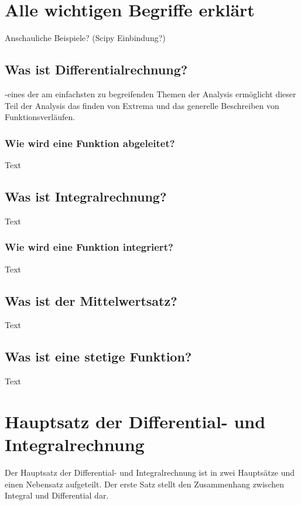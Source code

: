 \documentclass[fontsize=12pt,paper=a4,DIV12,cleardoublepage=empty, 
liststotoc,idxtotoc,bibtotoc]{article}
\theoremstyle{plain}
\theoremstyle{definition}
\begin{document}
	\section{Alle wichtigen Begriffe erklärt}
	Anschauliche Beispiele? (Scipy Einbindung?)
	
	
	\subsection{Was ist Differentialrechnung?}
	-eines der am einfachsten zu begreifenden Themen der Analysis ermöglicht dieser Teil der Analysis das finden von Extrema und das generelle Beschreiben von Funktionsverläufen.
	
	
	\subsubsection{Wie wird eine Funktion abgeleitet?}
		Text
	
	
	\subsection{Was ist Integralrechnung?}
		Text


	\subsubsection{Wie wird eine Funktion integriert?}
		Text
		
	
	\subsection{Was ist der Mittelwertsatz?}
		Text
		
	
	\subsection{Was ist eine stetige Funktion?}
		Text	
	
	
	
	
	\section{Hauptsatz der Differential- und Integralrechnung}
	
	Der Hauptsatz der Differential- und Integralrechnung ist in zwei Hauptsätze und einen Nebensatz aufgeteilt. Der erste Satz stellt den Zusammenhang zwischen Integral und Differential dar.
\end{document}
